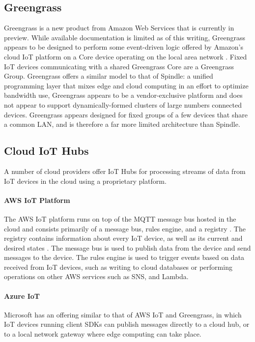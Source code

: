 \documentclass{thesis}
\begin{document}
    \subsection{Greengrass}
        Greengrass is a new product from Amazon Web Services that is currently in preview. While available
        documentation is limited as of this writing, Greengrass appears to be designed to perform some
        event-driven logic offered by Amazon's cloud IoT platform on a Core device operating
        on the local area network \cite{greengrass}. Fixed IoT devices communicating with a shared Greengrass Core are a
        Greengrass Group. Greengrass offers
        a similar model to that of Spindle: a unified programming layer that mixes edge and cloud computing
        in an effort to optimize bandwidth use, Greengrass appears to be a vendor-exclusive platform and does
        not appear to support dynamically-formed clusters of large numbers connected devices. Greengrass appears
        designed for fixed groups of a few devices that share a common LAN, and is therefore a far more limited
        architecture than Spindle.
    \subsection{Cloud IoT Hubs}
        A number of cloud providers offer IoT Hubs for processing streams of data from IoT devices in the cloud
        using a proprietary platform. 
        \paragraph{AWS IoT Platform}
           The AWS IoT platform runs on top of the MQTT message bus hosted in the cloud and consists primarily of a message bus, rules
           engine, and a registry  \cite{aws:iot}\cite{aws:iot:deepdive}. The registry contains information about every IoT device, as
           well as its current and desired states \cite{aws:iot:overview}.
           The message bus is used to publish data from the device and send messages to the device. The rules engine is used to trigger
           events based on data received from IoT devices, such as writing to cloud databases or performing operations on
           other AWS services such as SNS, and Lambda.
        \paragraph{Azure IoT}
            Microsoft has an offering similar to that of AWS IoT and Greengrass, in which IoT devices running client SDKs
            can publish messages directly to a cloud hub, or to a local network gateway where edge computing can take
            place.
\end{document}
